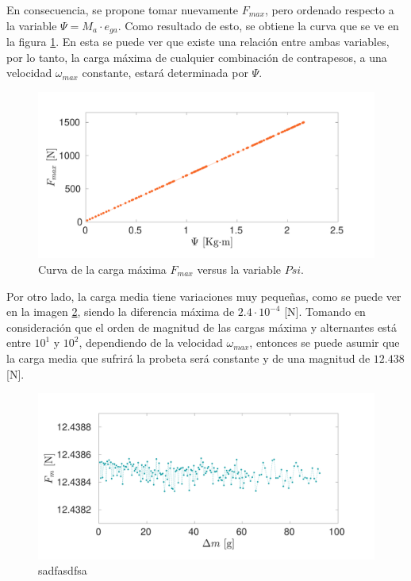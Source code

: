 En consecuencia, se propone tomar nuevamente $F_{max}$, pero ordenado respecto a la variable $\Psi = M_a \cdot e_{ga}$. Como resultado de esto, se obtiene la curva que se ve en la figura \ref{fig:fmax_psi}. En esta se puede ver que existe una relación entre ambas variables, por lo tanto, la carga máxima de cualquier combinación de contrapesos, a una velocidad $\omega_{max}$ constante, estará determinada por $\Psi$.

\begin{figure}[]
\centering
\includegraphics[width=\linewidth, trim={0cm 1cm 2cm 2cm},clip]{Imagenes/fmax_psi.pdf}
\caption{Curva de la carga máxima $F_{max}$ versus la variable $Psi$.}
\label{fig:fmax_psi}
\end{figure}
 
Por otro lado, la carga media tiene variaciones muy pequeñas, como se puede ver en la imagen \ref{fig:fm_dm}, siendo la diferencia máxima de $2.4\cdot10^{-4}$ [N]. Tomando en consideración que el orden de magnitud de las cargas máxima y alternantes está entre $10^1$ y $10^2$, dependiendo de la velocidad $\omega_{max}$, entonces se puede asumir que la carga media que sufrirá la probeta será constante y de una magnitud de $12.438$ [N]. 

\begin{figure}[]
\centering
\includegraphics[width=\linewidth, trim={0cm 1cm 2cm 2cm},clip]{Imagenes/fm_dm.pdf}
\caption{sadfasdfsa}
\label{fig:fm_dm}
\end{figure}


